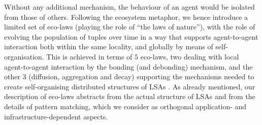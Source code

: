 \documentclass[12pt,a4paper,twoside,openright]{book}
\begin{document}
Without any additional mechanism, the behaviour of an agent would be isolated from those of others.
%
Following the ecosystem metaphor, we hence introduce a limited set of eco-laws (playing the role of ``the laws of nature''), with the role of evolving the population of tuples over time in a way that supports agent-to-agent interaction both within the same locality, and globally by means of self-organisation.
%
This is achieved in terms of $5$ eco-laws, two dealing with local agent-to-agent interaction by the bonding (and debonding) mechanism, and the other $3$ (diffusion, aggregation and decay) supporting the mechanisms needed to create self-organising distributed structures of LSAs \cite{FDMVA-NACO2012}.
%
As already mentioned, our description of eco-laws abstracts from the actual structure of LSAs and from the details of pattern matching, which we consider as orthogonal application- and infrastructure-dependent aspects.
\end{document}
